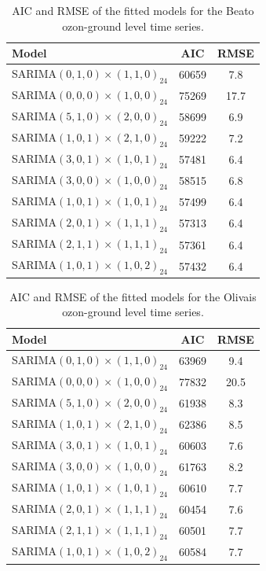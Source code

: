 \documentclass{article}
\begin{document}
\begin{table}
    \centering
    \begin{tabular}{|l|c|c|}
    \toprule
    \textbf{Model} & \textbf{AIC} & \textbf{RMSE} \\
    \midrule 
    SARIMA$(0,1,0) \times (1,1,0)_{24}$ & 60659 & 7.8 \\
    SARIMA$(0,0,0) \times (1,0,0)_{24}$ & 75269 & 17.7  \\
    SARIMA$(5,1,0) \times (2,0,0)_{24}$ & 58699 & 6.9 \\
    SARIMA$(1,0,1) \times (2,1,0)_{24}$ & 59222 & 7.2 \\
    SARIMA$(3,0,1) \times (1,0,1)_{24}$ & 57481 & 6.4 \\
    SARIMA$(3,0,0) \times (1,0,0)_{24}$ & 58515 & 6.8 \\
    SARIMA$(1,0,1) \times (1,0,1)_{24}$ & 57499 & 6.4 \\
    SARIMA$(2,0,1) \times (1,1,1)_{24}$ & 57313 & 6.4 \\
    SARIMA$(2,1,1) \times (1,1,1)_{24}$ & 57361 & 6.4 \\
    SARIMA$(1,0,1) \times (1,0,2)_{24}$ & 57432 & 6.4 \\
    \bottomrule
    \end{tabular}
    \caption{AIC and RMSE of the fitted models for the Beato ozon-ground level time series.}
    \label{tab:Beato}
\end{table}

\begin{table}
    \centering
    \begin{tabular}{|l|c|c|}
    \toprule
    \textbf{Model} & \textbf{AIC} & \textbf{RMSE} \\
    \midrule 
    SARIMA$(0,1,0) \times (1,1,0)_{24}$ & 63969 & 9.4 \\
    SARIMA$(0,0,0) \times (1,0,0)_{24}$ & 77832 & 20.5 \\
    SARIMA$(5,1,0) \times (2,0,0)_{24}$ &  61938 & 8.3 \\
    SARIMA$(1,0,1) \times (2,1,0)_{24}$ & 62386 & 8.5  \\
    SARIMA$(3,0,1) \times (1,0,1)_{24}$ & 60603 & 7.6 \\
    SARIMA$(3,0,0) \times (1,0,0)_{24}$ & 61763 & 8.2  \\
    SARIMA$(1,0,1) \times (1,0,1)_{24}$ & 60610 & 7.7 \\
    SARIMA$(2,0,1) \times (1,1,1)_{24}$ & 60454 & 7.6 \\
    SARIMA$(2,1,1) \times (1,1,1)_{24}$ & 60501 & 7.7 \\
    SARIMA$(1,0,1) \times (1,0,2)_{24}$ &  60584 & 7.7 \\
    \bottomrule
    \end{tabular}
    \caption{AIC and RMSE of the fitted models for the Olivais ozon-ground level time series.}
    \label{tab:Olivais}
\end{table}
\end{document}
